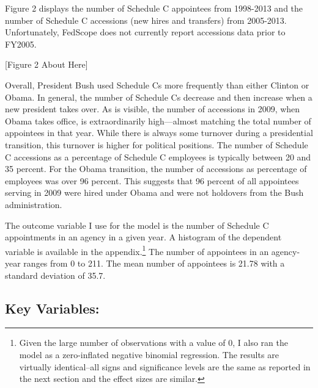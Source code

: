 \documentclass[12pt]{article}
\begin{document}
Figure 2 displays the number of Schedule C appointees from 1998-2013 and the number of Schedule C accessions (new hires and transfers) from 2005-2013. Unfortunately, FedScope does not currently report accessions data prior to FY2005. 

\begin{center}[Figure 2 About Here]\end{center}

Overall, President Bush used Schedule Cs more frequently than either Clinton or Obama. In general, the number of Schedule Cs decrease and then increase when a new president takes over. As is visible, the number of accessions in 2009, when Obama takes office, is extraordinarily high---almost matching the total number of appointees in that year. While there is always some turnover during a presidential transition, this turnover is higher for political positions. The number of Schedule C accessions as a percentage of Schedule C employees is typically between 20 and 35 percent. For the Obama transition, the number of accessions as percentage of employees was over 96 percent. This suggests that 96 percent of all appointees serving in 2009 were hired under Obama and were not holdovers from the Bush administration.

The outcome variable I use for the model is the number of Schedule C appointments in an agency in a given year. A histogram of the dependent variable is available in the appendix.\footnote{Given the large number of observations with a value of 0, I also ran the model as a zero-inflated negative binomial regression. The results are virtually identical--all signs and significance levels are the same as reported in the next section and the effect sizes are similar.} The number of appointees in an agency-year ranges from 0 to 211. The mean number of appointees is 21.78 with a standard deviation of 35.7.

\subsection*{Key Variables:}
\end{document}
